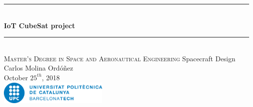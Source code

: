 
\begin{titlepage}

\newcommand{\HRule}{\rule{\linewidth}{0.5mm}} %

\center %


\HRule \\[0.2cm]
{ \Large \bfseries
IoT CubeSat project\\
}
\HRule \\[1.5cm]


\textsc{\large Master's Degree in Space and Aeronautical Engineering}
\large Spacecraft Design\\[0.8cm]

{ \normalsize Carlos Molina Ordóñez}\\

{\normalsize October $25^{th}$, 2018}\\[2cm] %

\includegraphics[width=0.4\textwidth]{img/UPC_logo.jpg}\\[0.4cm]


\vfill %

\end{titlepage}
